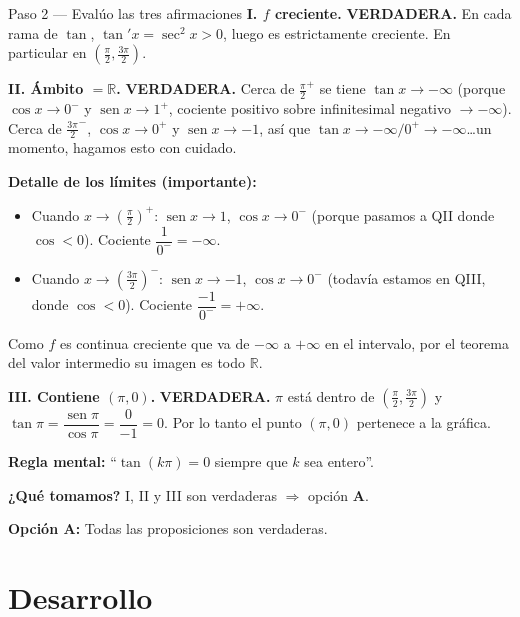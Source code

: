 \documentclass[11pt]{article}
\DeclareMathOperator{\sen}{sen}
\begin{document}
\begin{paso}{Paso 2 --- Evalúo las tres afirmaciones}
\textbf{I. $f$ creciente.} \textbf{VERDADERA.} En cada rama de $\tan$, $\tan'x=\sec^2 x>0$, luego es estrictamente creciente. En particular en $\left(\tfrac{\pi}{2},\tfrac{3\pi}{2}\right)$.

\textbf{II. Ámbito $=\mathbb{R}$.} \textbf{VERDADERA.} Cerca de $\tfrac{\pi}{2}^+$ se tiene $\tan x\to -\infty$ (porque $\cos x\to 0^-$ y $\sen x\to 1^+$, cociente positivo sobre infinitesimal negativo $\to -\infty$). Cerca de $\tfrac{3\pi}{2}^-$, $\cos x\to 0^+$ y $\sen x\to -1$, así que $\tan x\to -\infty/0^+\to -\infty$\ldots un momento, hagamos esto con cuidado.

\smallskip
\textbf{Detalle de los límites (importante):}
\begin{itemize}[leftmargin=*]
  \item Cuando $x\to (\tfrac{\pi}{2})^+$: $\sen x\to 1$, $\cos x\to 0^-$ (porque pasamos a QII donde $\cos<0$). Cociente $\dfrac{1}{0^-}=-\infty$.
  \item Cuando $x\to (\tfrac{3\pi}{2})^-$: $\sen x\to -1$, $\cos x\to 0^-$ (todavía estamos en QIII, donde $\cos<0$). Cociente $\dfrac{-1}{0^-}=+\infty$.
\end{itemize}
Como $f$ es continua creciente que va de $-\infty$ a $+\infty$ en el intervalo, por el teorema del valor intermedio su imagen es todo $\mathbb{R}$.

\textbf{III. Contiene $(\pi,0)$.} \textbf{VERDADERA.} $\pi$ está dentro de $\left(\tfrac{\pi}{2},\tfrac{3\pi}{2}\right)$ y $\tan\pi=\dfrac{\sen\pi}{\cos\pi}=\dfrac{0}{-1}=0$. Por lo tanto el punto $(\pi,0)$ pertenece a la gráfica.

\textbf{Regla mental:} ``$\tan(k\pi)=0$ siempre que $k$ sea entero''.

\textbf{¿Qué tomamos?} I, II y III son verdaderas $\Rightarrow$ opción \textbf{A}.
\end{paso}

\begin{resp}
\textbf{Opción A:} Todas las proposiciones son verdaderas.
\end{resp}

\clearpage
\section*{Desarrollo}

\end{document}
